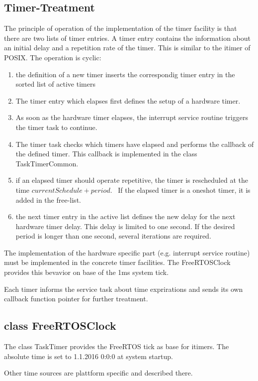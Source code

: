 \subsection{Timer-Treatment}
The principle of operation of the implementation of the timer facility is
that there are two lists of timer entries. A timer entry contains 
the information about an initial delay and a repetition rate of the timer.
This is similar to the itimer of POSIX.
The operation is cyclic:
\begin{enumerate}
\item the definition of a new timer inserts the correspondig timer entry
   in the sorted list of active timers
\item The timer entry which elapses first defines the setup of a hardware timer.
\item As soon as the hardware timer elapses, the interrupt service  routine
triggers the timer task to continue.
\item The timer task checks which timers have elapsed and performs the 
callback of the defined timer. This callback is implemented in the
class TaskTimerCommon.
\item if an elapsed timer should operate repetitive, the timer is rescheduled
   at the time $currentSchedule + period$. \
	If the elapsed timer is a oneshot timer, it is added in the free-list.
\item the next timer entry in the active list defines the new delay for the
  next hardware timer delay. This delay is limited to one second. If the 
  desired period is longer than one second, several iterations are required.
\end{enumerate}

The implementation of the hardware specific part
(e.g. interrupt service routine) must be implemented in the concrete
timer facilities. The FreeRTOSClock provides this bevavior on base
of the 1ms system tick.

Each timer informs the service task about time exprirations and 
sends its own callback function pointer for further treatment.

\subsection{class FreeRTOSClock}
The class TaskTimer provides the FreeRTOS tick as
base for itimers.
The absolute time is set to 1.1.2016 0:0:0 at system startup.

Other time sources are plattform specific and described there.


